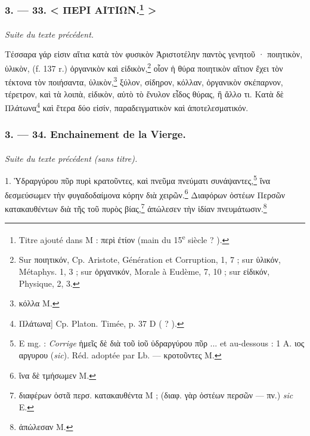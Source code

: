 \documentclass[landscape, a4paper, 11pt, oneside, polutonikogreek, french]{article}
\begin{document}
\bigskip
\centerline{\EightStarTaper}
\centerline{\EightStarTaper\EightStarTaper}
\bigskip

\subsubsection[3. --- 33. < ΠΕΡΙ ΑΙΤΙΩΝ. >]{3. --- 33. < ΠΕΡΙ ΑΙΤΙΩΝ.\footnote{Titre ajouté dans M : περὶ ἐτίον (main du 15\textsuperscript{e} siècle ? ).} >}
\paragraph{}
\emph{Suite du texte précédent.}

\bigskip

Τέσσαρα γάρ εἰσιν αἴτια κατὰ τὸν φυσικὸν Ἀριστοτέλην παντὸς γενητοῦ · ποιητικὸν, ὑλικὸν, (f. 137 r.) ὀργανικὸν καὶ εἰδικὸν,\footnote{Sur ποιητικόν, Cp. Aristote, Génération et Corruption, 1, 7 ; sur ὑλικόν, Métaphys. 1, 3 ; sur ὀργανικόν, Morale à Eudème, 7, 10 ; sur εἰδικόν, Physique, 2, 3.} οἷον ἡ θύρα ποιητικὸν αἴτιον ἔχει τὸν τέκτονα τὸν ποιήσαντα, ὑλικὸν,\footnote{κόλλα M.} ξύλον, σίδηρον, κόλλαν, ὀργανικὸν σκέπαρνον, τέρετρον, καὶ τὰ λοιπὰ, εἰδικὸν, αὐτὸ τὸ ἔνυλον εἶδος θύρας, ἢ ἄλλο τι. Κατὰ δὲ Πλάτωνα\footnote{Πλάτωνα] Cp. Platon. Timée, p. 37 D ( ? ).} καὶ ἕτερα δύο εἰσίν, παραδειγματικὸν καὶ ἀποτελεσματικόν.

\bigskip
\centerline{\EightStarTaper}
\centerline{\EightStarTaper\EightStarTaper}
\bigskip

\subsubsection{3. --- 34. Enchainement de la Vierge.}
\paragraph{}
\emph{Suite du texte précédent (sans titre).}

\bigskip

1. Ὑδραργύρου πῦρ πυρὶ κρατοῦντες, καὶ πνεῦμα πνεύματι συνάψαντες,\footnote{E mg. : \emph{Corrige} ἡμεῖς δὲ διὰ τοῦ ἰοῦ ὐδραργύρου πῦρ ... et au-dessous : 1 A. ιος αργυρου (\emph{sic}). Réd. adoptée par Lb. --- κροτοῦντες M.} ἵνα δεσμεύσωμεν τὴν φυγαδοδαίμονα κόρην διὰ χειρῶν.\footnote{ἵνα δὲ τμήσωμεν M.} Διαφόρων ὀστέων Περσῶν κατακαυθέντων διὰ τῆς τοῦ πυρὸς βίας,\footnote{διαφέρων ὁστᾶ περσ. κατακαυθέντα M ; (διαφ. γὰρ ὀστέων περσῶν --- πν.) \emph{sic} E.} ἀπώλεσεν τὴν ἰδίαν πνευμάτωσιν.\footnote{ἀπώλεσαν M.}
\end{document}
